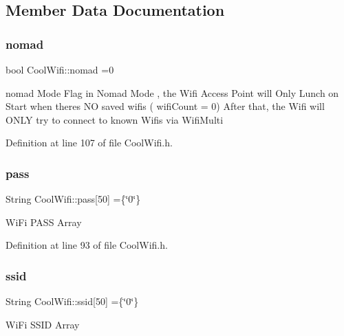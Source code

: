 \subsection{Member Data Documentation}
\mbox{\label{class_cool_wifi_ab7d9643c4af7bac3be331ef008b2ea27}} 
\subsubsection{\texorpdfstring{nomad}{nomad}}
{\footnotesize\ttfamily bool Cool\+Wifi\+::nomad =0\hspace{0.3cm}{\ttfamily [private]}}

nomad Mode Flag in Nomad Mode , the Wifi Access Point will Only Lunch on Start when there\textquotesingle{}s NO saved wifis ( wifi\+Count = 0) After that, the Wifi will O\+N\+LY try to connect to known Wifis via Wifi\+Multi 

Definition at line 107 of file Cool\+Wifi.\+h.

\mbox{\label{class_cool_wifi_a0c3332a149245aaad060b32593a54c9b}} 
\subsubsection{\texorpdfstring{pass}{pass}}
{\footnotesize\ttfamily String Cool\+Wifi\+::pass\mbox{[}50\mbox{]} =\{\char`\"{}0\char`\"{}\}\hspace{0.3cm}{\ttfamily [private]}}

Wi\+Fi P\+A\+SS Array 

Definition at line 93 of file Cool\+Wifi.\+h.

\mbox{\label{class_cool_wifi_a893b21d0fed821438733bba2e73fb4c2}} 
\subsubsection{\texorpdfstring{ssid}{ssid}}
{\footnotesize\ttfamily String Cool\+Wifi\+::ssid\mbox{[}50\mbox{]} =\{\char`\"{}0\char`\"{}\}\hspace{0.3cm}{\ttfamily [private]}}

Wi\+Fi S\+S\+ID Array 

